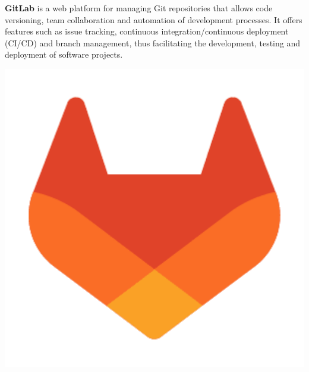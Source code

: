 \noindent
\begin{minipage}{.7\textwidth}%
    \textbf{GitLab} is a web platform for managing Git repositories that allows code versioning, team collaboration and automation of development processes. It offers features such as issue tracking, continuous integration/continuous deployment (CI/CD) and branch management, thus facilitating the development, testing and deployment of software projects.
\end{minipage}%
\hfill
\begin{minipage}{.20\textwidth}%
\includegraphics[width=1\textwidth]{images/gitlab.png}
\end{minipage} \\ \\ \\ 

